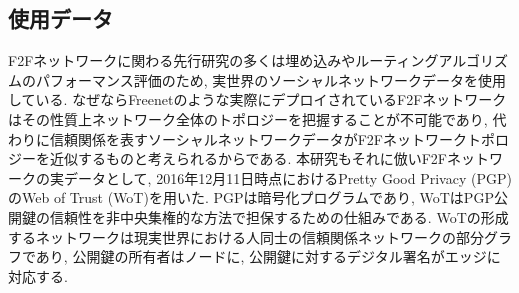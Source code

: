 \documentclass[technicalreport]{./ieicej-v3.0/UTF/ieicej}
\begin{document}
  \subsection{使用データ} \label{sec:wot}
  F2Fネットワークに関わる先行研究の多くは埋め込みやルーティングアルゴリズムのパフォーマンス評価のため, 実世界のソーシャルネットワークデータを使用している. なぜならFreenetのような実際にデプロイされているF2Fネットワークはその性質上ネットワーク全体のトポロジーを把握することが不可能であり, 代わりに信頼関係を表すソーシャルネットワークデータがF2Fネットワークトポロジーを近似するものと考えられるからである. 本研究もそれに倣いF2Fネットワークの実データとして, 2016年12月11日時点におけるPretty Good Privacy (PGP)のWeb of Trust (WoT)を用いた. PGPは暗号化プログラムであり, WoTはPGP公開鍵の信頼性を非中央集権的な方法で担保するための仕組みである\cite{zimmermann1995official}. WoTの形成するネットワークは現実世界における人同士の信頼関係ネットワークの部分グラフであり, 公開鍵の所有者はノードに, 公開鍵に対するデジタル署名がエッジに対応する. 
\end{document}
